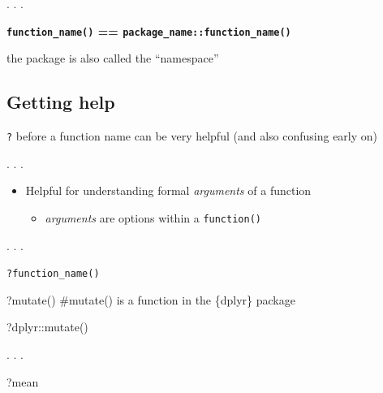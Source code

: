 \documentclass[
  letterpaper,
  DIV=11,
  numbers=noendperiod,
  oneside]{scrartcl}
\newenvironment{Shaded}{\begin{snugshade}}{\end{snugshade}}
\newcommand{\CommentTok}[1]{\textcolor[rgb]{0.37,0.37,0.37}{#1}}
\newcommand{\FunctionTok}[1]{\textcolor[rgb]{0.28,0.35,0.67}{#1}}
\newcommand{\NormalTok}[1]{\textcolor[rgb]{0.00,0.23,0.31}{#1}}
\newcommand{\SpecialCharTok}[1]{\textcolor[rgb]{0.37,0.37,0.37}{#1}}
\providecommand{\tightlist}{%
  \setlength{\itemsep}{0pt}\setlength{\parskip}{0pt}}\usepackage{longtable,booktabs,array}
\begin{document}
. . .

\textbf{\texttt{function\_name()} ==
\texttt{package\_name::function\_name()}}

the package is also called the ``namespace''

\hypertarget{getting-help}{%
\subsection{Getting help}\label{getting-help}}

\texttt{?} before a function name can be very helpful (and also
confusing early on)

. . .

\begin{itemize}
\tightlist
\item
  Helpful for understanding formal \emph{arguments} of a function

  \begin{itemize}
  \tightlist
  \item
    \emph{arguments} are options within a \texttt{function()}
  \end{itemize}
\end{itemize}

. . .

\texttt{?function\_name()}

\begin{Shaded}
\begin{Highlighting}[]
\NormalTok{?}\FunctionTok{mutate}\NormalTok{() }\CommentTok{\#mutate() is a function in the \{dplyr\} package}

\NormalTok{?dplyr}\SpecialCharTok{::}\FunctionTok{mutate}\NormalTok{()}
\end{Highlighting}
\end{Shaded}

. . .

\begin{Shaded}
\begin{Highlighting}[]
\NormalTok{?mean}
\end{Highlighting}
\end{Shaded}

\hypertarget{section-5}{%
\subsection{}\label{section-5}}
\end{document}

